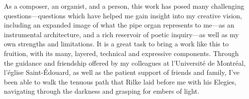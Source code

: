 \documentclass[12pt,twoside,maitrise]{dms_ks}
\theoremstyle{definition}
\begin{document}
{{As a composer, an organist, and a person, this work has posed many challenging questions---questions which have helped me gain insight into my creative vision, including an expanded image of what the pipe organ represents to me---as an instrumental architecture, and a rich reservoir of poetic inquiry---as well as my own strengths and limitations. 
It is a great task to bring a work like this to fruition, with its many, layered, technical and expressive components. 
Through the guidance and friendship offered by my colleagues at l'Université de Montréal, l'église Saint-Édouard, as well as the patient support of friends and family, I've been able to walk the tenuous path that Rilke laid before me with his Elegies, navigating through the darkness and grasping for embers of light. 





\printbibliography


}}
\end{document}
